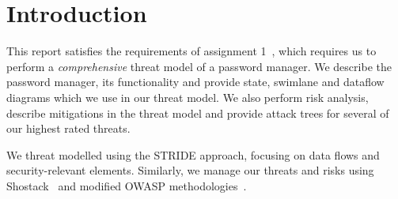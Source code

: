 \chapter{Introduction}
\label{ch:introduction}

This report satisfies the requirements of assignment
1~\cite{2017myersa1handout}, which requires us to perform a
\textit{comprehensive} threat model of a password manager.  We describe the
password manager, its functionality and provide state, swimlane and dataflow diagrams
which we use in our threat model. We also perform risk analysis, describe
mitigations in the threat model and provide attack trees for several of our
highest rated threats.  

\par We threat modelled using the STRIDE approach, focusing on data
flows and security-relevant elements.
Similarly, we manage our threats and risks using
Shostack~\cite{shostackbook} and modified OWASP
methodologies~\cite{owasprisk}.




